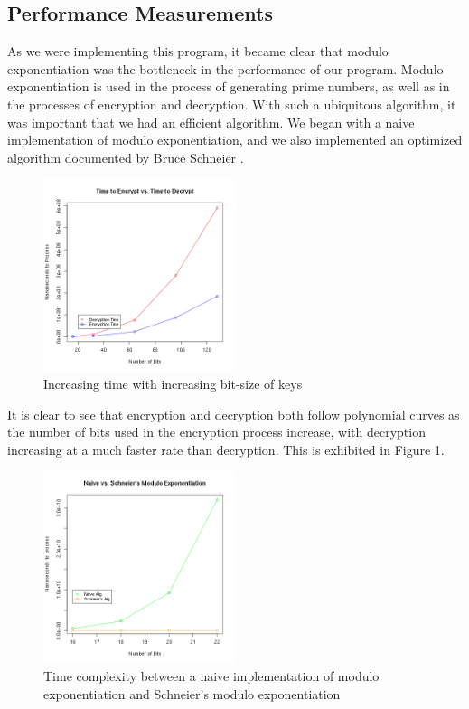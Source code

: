\documentclass[12pt,technote]{IEEEtran}
\begin{document}
\subsection{Performance Measurements}
\par As we were implementing this program, it became clear that modulo
exponentiation was the bottleneck in the performance of our program. Modulo
exponentiation is used in the process of generating prime numbers, as well as in
the processes of encryption and decryption. With such a ubiquitous algorithm, it
was important that we had an efficient algorithm. We began with a naive
implementation of modulo exponentiation, and we also implemented an optimized
algorithm documented by Bruce Schneier \cite{sonsec}.
\begin{figure}
	\begin{center}
		\includegraphics[width=0.5\textwidth]{cryptimes}
		\caption{Increasing time with increasing bit-size of keys}
	\end{center}
\end{figure}
\par It is clear to see that encryption and decryption both follow polynomial
curves as the number of bits used in the encryption process increase, with
decryption increasing at a much faster rate than decryption. This is exhibited
in Figure 1.
\begin{figure}
	\begin{center}
		\includegraphics[width=0.5\textwidth]{modexp}
		\caption{Time complexity between a naive implementation of modulo
		exponentiation and Schneier's modulo exponentiation\cite{sonsec}}
	\end{center}
\end{figure}
\end{document}
